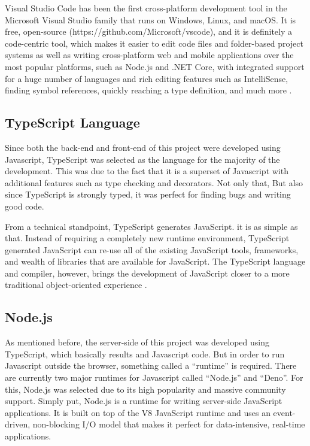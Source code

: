 \documentclass[12pt]{report}
\begin{document}
Visual Studio Code has been the first cross-platform development tool in the Microsoft Visual Studio family that runs on Windows, Linux, and macOS. It is free, open-source (https://github.com/Microsoft/vscode), and it is definitely a code-centric tool, which makes it easier to edit code files and folder-based project systems as well as writing cross-platform web and mobile applications over the most popular platforms, such as Node.js and .NET Core, with integrated support for a huge number of languages and rich editing features such as IntelliSense, finding symbol references, quickly reaching a type definition, and much more \cite{alessandro_2019_visual_studio}.

\subsection{TypeScript Language}
Since both the back-end and front-end of this project were developed using Javascript, TypeScript was selected as the language for the majority of the development. This was due to the fact that it is a superset of Javascript with additional features such as type checking and decorators. Not only that, But also since TypeScript is strongly typed, it was perfect for finding bugs and writing good code.

From a technical standpoint, TypeScript generates JavaScript. it is as simple as that. Instead of requiring a completely new runtime environment, TypeScript generated JavaScript can re-use all of the existing JavaScript tools, frameworks, and wealth of libraries that are available for JavaScript. The TypeScript language and compiler, however, brings the development of JavaScript closer to a more traditional object-oriented experience \cite{rozentals_2015_typescript}.

\subsection{Node.js}
As mentioned before, the server-side of this project was developed using TypeScript, which basically results and Javascript code. But in order to run Javascript outside the browser, something called a ``runtime'' is required. There are currently two major runtimes for Javascript called ``Node.js'' and ``Deno''. For this, Node.js was selected due to its high popularity and massive community support. Simply put, Node.js is a runtime for writing server-side JavaScript applications. It is built on top of the V8 JavaScript runtime and uses an event-driven, non-blocking I/O model that makes it perfect for data-intensive, real-time applications.
\end{document}
